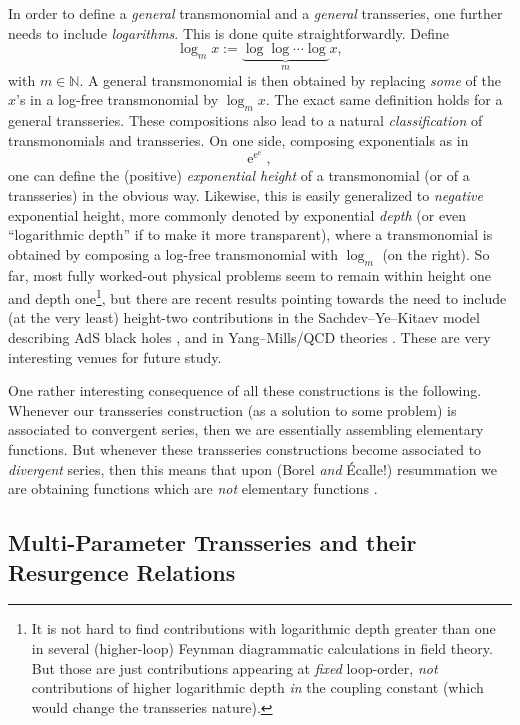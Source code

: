 \documentclass[11pt,a4paper]{article}
\def\BN{{\mathbb N}}
\newcommand{\be}{\begin{equation}}
\newcommand{\ee}{\end{equation}}
\newcommand{\rme}{{\mathrm{e}}}
\begin{document}
In order to define a \textit{general} transmonomial and a \textit{general} transseries, one further needs to include \textit{logarithms}. This is done quite straightforwardly. Define
%
\be
\log_m x := \underbrace{\log \log \cdots \log }_{m} x,
\ee
%
\noindent
with $m \in \BN$. A general transmonomial is then obtained by replacing \textit{some} of the $x$'s in a log-free transmonomial by $\log_m x$. The exact same definition holds for a general transseries. These compositions also lead to a natural \textit{classification} of transmonomials and transseries. On one side, composing exponentials as in
%
\be
\rme^{\rme^{\rme^{\cdots}}},
\ee
%
\noindent
one can define the (positive) \textit{exponential height} of a transmonomial (or of a transseries) in the obvious way. Likewise, this is easily generalized to \textit{negative} exponential height, more commonly denoted by exponential \textit{depth} (or even ``logarithmic depth'' if to make it more transparent), where a transmonomial is obtained by composing a log-free transmonomial with $\log_m$ (on the right). So far, most fully worked-out physical problems seem to remain within height one and depth one\footnote{It is not hard to find contributions with logarithmic depth greater than one in several (higher-loop) Feynman diagrammatic calculations in field theory. But those are just contributions appearing at \textit{fixed} loop-order, \textit{not} contributions of higher logarithmic depth \textit{in} the coupling constant (which would change the transseries nature).}, but there are recent results pointing towards the need to include (at the very least) height-two contributions in the Sachdev--Ye--Kitaev model describing AdS black holes \cite{cghpsssst16}, and in Yang--Mills/QCD theories \cite{acpy17}. These are very interesting venues for future study.

One rather interesting consequence of all these constructions is the following. Whenever our transseries construction (as a solution to some problem) is associated to convergent series, then we are essentially assembling elementary functions. But whenever these transseries constructions become associated to \textit{divergent} series, then this means that upon (Borel \textit{and} \'Ecalle!) resummation we are obtaining functions which are \textit{not} elementary functions \cite{e08}.

\subsection*{Multi-Parameter Transseries and their Resurgence Relations}
\end{document}
